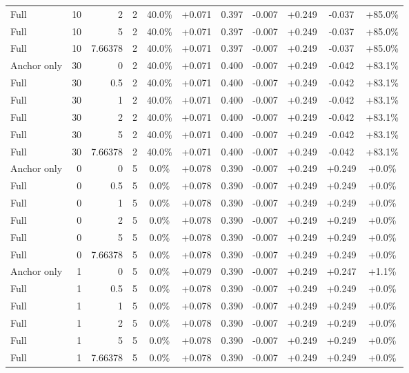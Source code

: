 \begin{table}[htbp]
\begin{tabular}{lrrrccccccc}
Full & 10 & 2 & 2 & 40.0\% & +0.071 & 0.397 & -0.007 & +0.249 & -0.037 & +85.0\% \\
Full & 10 & 5 & 2 & 40.0\% & +0.071 & 0.397 & -0.007 & +0.249 & -0.037 & +85.0\% \\
Full & 10 & 7.66378 & 2 & 40.0\% & +0.071 & 0.397 & -0.007 & +0.249 & -0.037 & +85.0\% \\
Anchor only & 30 & 0 & 2 & 40.0\% & +0.071 & 0.400 & -0.007 & +0.249 & -0.042 & +83.1\% \\
Full & 30 & 0.5 & 2 & 40.0\% & +0.071 & 0.400 & -0.007 & +0.249 & -0.042 & +83.1\% \\
Full & 30 & 1 & 2 & 40.0\% & +0.071 & 0.400 & -0.007 & +0.249 & -0.042 & +83.1\% \\
Full & 30 & 2 & 2 & 40.0\% & +0.071 & 0.400 & -0.007 & +0.249 & -0.042 & +83.1\% \\
Full & 30 & 5 & 2 & 40.0\% & +0.071 & 0.400 & -0.007 & +0.249 & -0.042 & +83.1\% \\
Full & 30 & 7.66378 & 2 & 40.0\% & +0.071 & 0.400 & -0.007 & +0.249 & -0.042 & +83.1\% \\
Anchor only & 0 & 0 & 5 & 0.0\% & +0.078 & 0.390 & -0.007 & +0.249 & +0.249 & +0.0\% \\
Full & 0 & 0.5 & 5 & 0.0\% & +0.078 & 0.390 & -0.007 & +0.249 & +0.249 & +0.0\% \\
Full & 0 & 1 & 5 & 0.0\% & +0.078 & 0.390 & -0.007 & +0.249 & +0.249 & +0.0\% \\
Full & 0 & 2 & 5 & 0.0\% & +0.078 & 0.390 & -0.007 & +0.249 & +0.249 & +0.0\% \\
Full & 0 & 5 & 5 & 0.0\% & +0.078 & 0.390 & -0.007 & +0.249 & +0.249 & +0.0\% \\
Full & 0 & 7.66378 & 5 & 0.0\% & +0.078 & 0.390 & -0.007 & +0.249 & +0.249 & +0.0\% \\
Anchor only & 1 & 0 & 5 & 0.0\% & +0.079 & 0.390 & -0.007 & +0.249 & +0.247 & +1.1\% \\
Full & 1 & 0.5 & 5 & 0.0\% & +0.078 & 0.390 & -0.007 & +0.249 & +0.249 & +0.0\% \\
Full & 1 & 1 & 5 & 0.0\% & +0.078 & 0.390 & -0.007 & +0.249 & +0.249 & +0.0\% \\
Full & 1 & 2 & 5 & 0.0\% & +0.078 & 0.390 & -0.007 & +0.249 & +0.249 & +0.0\% \\
Full & 1 & 5 & 5 & 0.0\% & +0.078 & 0.390 & -0.007 & +0.249 & +0.249 & +0.0\% \\
Full & 1 & 7.66378 & 5 & 0.0\% & +0.078 & 0.390 & -0.007 & +0.249 & +0.249 & +0.0\% \\

\end{tabular}
\end{table}
